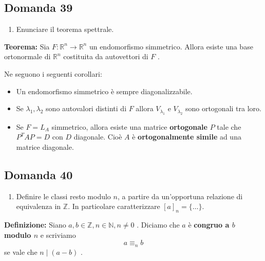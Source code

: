 \documentclass[
  a4paper,
]{article}
\providecommand{\tightlist}{%
  \setlength{\itemsep}{0pt}\setlength{\parskip}{0pt}}
\providecommand{\tightlist}{}
\begin{document}
\hypertarget{domanda-39}{%
\subsection{Domanda 39}\label{domanda-39}}

\begin{observationbox}[Domanda]
\begin{enumerate}
\def\labelenumi{\arabic{enumi}.}
\setcounter{enumi}{38}
\tightlist
\item
  Enunciare il teorema spettrale.
\end{enumerate}
\end{observationbox}

\textbf{Teorema:} Sia \(F: \mathbb{R}^n \to \mathbb{R}^n\) un
endomorfismo simmetrico. Allora esiste una base ortonormale di
\(\mathbb{R}^n\) costituita da autovettori di \(F\) .

Ne seguono i seguenti corollari:

\begin{itemize}
\tightlist
\item
  Un endomorfismo simmetrico è sempre diagonalizzabile.
\item
  Se \(\lambda_1, \lambda_2\) sono autovalori distinti di \(F\) allora
  \(V_{\lambda_1}\) e \(V_{\lambda_2}\) sono ortogonali tra loro.
\item
  Se \(F = L_A\) simmetrico, allora esiste una matrice
  \textbf{ortogonale} \(P\) tale che \(P^TAP =D\) con \(D\) diagonale.
  Cioè \(A\) è \textbf{ortogonalmente simile} ad una matrice diagonale.
\end{itemize}

\hypertarget{domanda-40}{%
\subsection{Domanda 40}\label{domanda-40}}

\begin{observationbox}[Domanda]
\begin{enumerate}
\def\labelenumi{\arabic{enumi}.}
\setcounter{enumi}{39}
\tightlist
\item
  Definire le classi resto modulo \(n\), a partire da un'opportuna
  relazione di equivalenza in \(\mathbb{Z}\). In particolare
  caratterizzare \([a]_n = \{\dots\}\).
\end{enumerate}
\end{observationbox}

\textbf{Definizione:} Siano
\(a, b \in \mathbb{Z}, n \in \mathbb{N}, n \neq 0\) . Diciamo che \(a\)
è \textbf{congruo a \(b\) modulo \(n\)} e scriviamo \[
a \equiv_n b
\] se vale che \(n \mid (a-b)\) .
\end{document}
